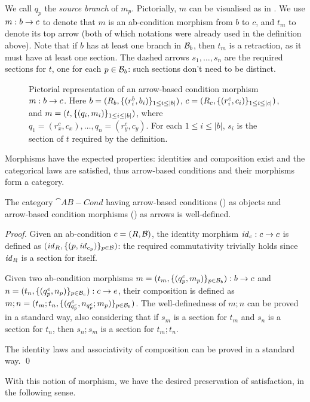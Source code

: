 We call $q_p$ the \emph{source branch} of $m_p$. Pictorially, $m$ can be visualised as in . We use $m:b\rightarrow c$ to denote that $m$ is an ab-condition morphism from $b$ to $c$, and $t_m$ to denote its top arrow (both of which notations were already used in the definition above). Note that if $b$ has at least one branch in $\mathcal{B}_b$, then $t_m$ is a retraction, as it must have at least one section.  The dashed arrows $s_1, \ldots, s_n$ are the required sections for $t$, one for each $p\in \mathcal{B}_b$: such sections don't need to be distinct.  

%
\begin{figure}
  \centering
  
  \caption{Pictorial representation of an arrow-based condition morphism $m:b\rightarrow c$. Here $b=(R_b, \{{(r^b_i,b_i)}\}_{1\leq i\leq |b|})$, $c=(R_c, \{{(r^c_i,c_i)}\}_{1\leq i\leq |c|})$, and     
  $m = (t,\{{(q_i,m_i)}\}_{1\leq i \leq |b|})$, where $q_1 = (r^c_x,c_x), \ldots,q_n = (r^c_y,c_y)$. For each $1 \leq i \leq |b|$, $s_i$ is the section of $t$ required by the definition.}
\end{figure}

\medskip\noindent Morphisms have the expected properties: identities and composition exist and the categorical laws are satisfied, thus arrow-based conditions and their morphisms form a category.
%

\begin{proposition}
  The category $\cat{AB-Cond}$ having arrow-based conditions () as objects and arrow-based condition morphisms () as arrows is well-defined.
\end{proposition}
 
\begin{proof}
  Given an ab-condition $c=(R,\mathcal{B})$, the identity morphism $\mathit{id}_c:c\rightarrow c$ is defined as $(\mathit{id}_R,\{{(p,\mathit{id}_{c_p})}\}_{p\in \mathcal{B}})$: the required commutativity trivially holds since $\mathit{id}_R$ is a section for itself.
  
Given two ab-condition morphisms $m= (t_m,\{{(q^c_p,m_p)}\}_{p\in \mathcal{B}_b}):b\rightarrow c$ and $n = (t_n,\{{(q^e_p,n_p)}\}_{p\in \mathcal{B}_c}):c\rightarrow e$, their composition is defined as $m;n=(t_m;t_n,\{{(q^e_{q^c_p},n_{q^c_p};m_p)}\}_{p\in \mathcal{B}_b})$.
The well-definedness of $m;n$ can be proved in a standard way, also considering that if $s_m$ is a section for $t_m$ and $s_n$ is a section for $t_n$, then $s_n;s_m$ is a section for $t_m;t_n$.

The identity laws and associativity of composition can be proved in a standard way. \qed
\end{proof}
%
With this notion of morphism, we have the desired preservation of satisfaction, in the following sense.

